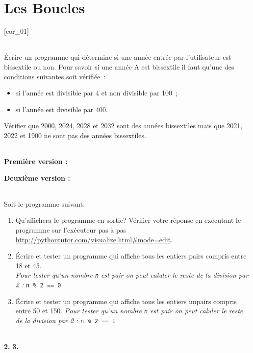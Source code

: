 \documentclass[a4paper,12pt]{article}
\newcommand{\numero}{9}                                    %
\begin{document}


\setcounter{section}{\numero}
\section{Les Boucles}				
[cor_01]

\exo{}  ~\\ 
Écrire un programme qui détermine si une année entrée par l’utilisateur est bissextile ou non.
Pour savoir si une année A est bissextile il faut qu’une des conditions suivantes soit vérifiée :
\begin{itemize}
	\item si l'année est divisible par 4 et non divisible par 100 ;
	\item si l'année est divisible par 400.
\end{itemize}
Vérifier que 2000, 2024, 2028 et 2032 sont des années bissextiles mais que 2021, 2022 et 1900 ne sont pas des années  bissextiles.
\begin{correction}
	~\\ 
	\textbf{Première version :}
	
	
	\textbf{Deuxième version :}	
		
	
\end{correction}
\finexo

\exo{}  ~\\ 
Soit le programme suivant:

\begin{enumerate}
	\item Qu’affichera le programme en sortie? Vérifier votre réponse en exécutant le programme sur l'exécuteur pas à pas \url{http://pythontutor.com/visualize.html#mode=edit}.
	\item Écrire et tester un programme qui affiche tous les entiers pairs compris entre 18 et 45.\\
	\textit{Pour tester qu'un nombre \lstinline{n} est pair on peut caluler le reste de la division par 2 : }\lstinline!n % 2 == 0!
	\item Écrire et tester un programme qui affiche tous les entiers impairs compris entre 50 et 150.
	\textit{Pour tester qu'un nombre \lstinline{n} est pair on peut caluler le reste de la division par 2 : }\lstinline!n % 2 == 1!
\end{enumerate}
\begin{correction}
	~\\ 
	\textbf{2.}
	\textbf{3.} 
\end{correction}
\finexo
\end{document}
